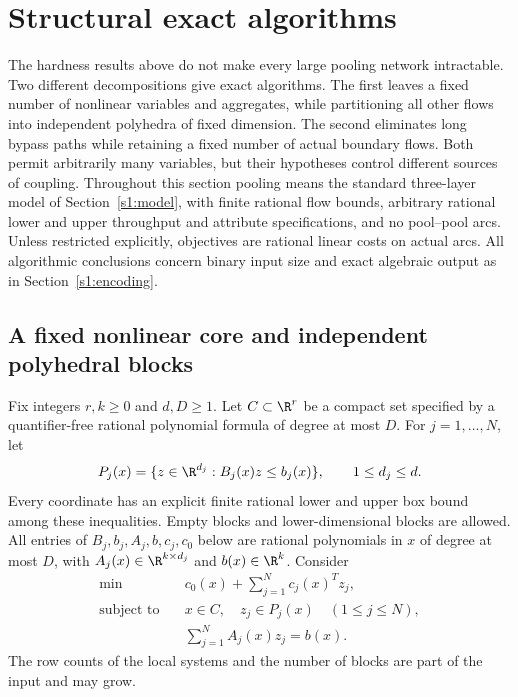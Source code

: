 \section{Structural exact algorithms}\label{s4:structural}

The hardness results above do not make every large pooling network
intractable. Two different decompositions give exact algorithms. The
first leaves a fixed number of nonlinear variables and aggregates, while
partitioning all other flows into independent polyhedra of fixed
dimension. The second eliminates long bypass paths while retaining a
fixed number of actual boundary flows. Both permit arbitrarily many
variables, but their hypotheses control different sources of coupling.
Throughout this section pooling means the standard three-layer model of
Section~\ref{s1:model}, with finite rational flow bounds, arbitrary
rational lower and upper throughput and attribute specifications, and
no pool--pool arcs. Unless restricted explicitly, objectives are rational
linear costs on actual arcs. All algorithmic conclusions concern binary
input size and exact algebraic output as in Section~\ref{s1:encoding}.

\subsection{A fixed nonlinear core and independent polyhedral blocks}
\label{s4:core-model}

Fix integers $r,k\ge0$ and $d,D\ge1$. Let $C\subset\R^r$ be a compact
set specified by a quantifier-free rational polynomial formula of degree
at most $D$. For $j=1,\ldots,N$, let
\[
 P_j(x)=\{z\in\R^{d_j}:B_j(x)z\le b_j(x)\},\qquad 1\le d_j\le d.
\]
Every coordinate has an explicit finite rational lower and upper box
bound among these inequalities. Empty blocks and lower-dimensional
blocks are allowed. All entries of $B_j,b_j,A_j,b,c_j,c_0$ below are
rational polynomials in $x$ of degree at most $D$, with
$A_j(x)\in\R^{k\times d_j}$ and $b(x)\in\R^k$. Consider
\begin{equation}
 \begin{aligned}
 \min\quad &c_0(x)+\sum_{j=1}^N c_j(x)^Tz_j,\\
 \text{subject to}\quad &x\in C,\quad z_j\in P_j(x)\quad(1\le j\le N),\\
 &\sum_{j=1}^N A_j(x)z_j=b(x).
 \end{aligned}\label{s4:block-model}
\end{equation}
The row counts of the local systems and the number of blocks are part
of the input and may grow.

